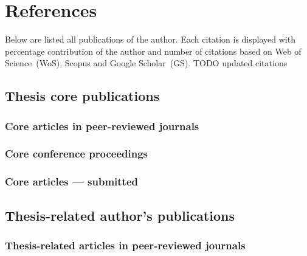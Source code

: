 \documentclass[a4paper,11pt,titlepage,twoside]{book}
\newcommand{\todo}[1]{{\color{red} TODO {#1}}}
\newcommand{\chapternoclear}[1]{
  \begingroup
  \let\cleardoublepage\clearpage
  \chapter{#1}
  \endgroup
}
\begin{document}
\chapternoclear{References}

Below are listed all publications of the author.
Each citation is displayed with percentage contribution of the author and number of citations based on Web of Science~(WoS), Scopus and Google Scholar~(GS).
\todo{updated citations}


\section{Thesis core publications}

\subsection*{Core articles in peer-reviewed journals}
\printbibliography[keyword={mine},keyword={phd_related},keyword={journal},keyword={core},notkeyword={submitted},heading=none,title={}]

\subsection*{Core conference proceedings}
\printbibliography[keyword={mine},keyword={phd_related},keyword={conference},keyword={core},notkeyword={submitted},heading=none,title={}]

\subsection*{Core articles --- submitted}
\printbibliography[keyword={mine},keyword={phd_related},keyword={submitted},keyword={core},heading=none,title={}]



\section{Thesis-related author's publications}

\subsection*{Thesis-related articles in peer-reviewed journals}
\printbibliography[keyword={mine},keyword={phd_related},keyword={journal},notkeyword={core},notkeyword={submitted},heading=none,title={}]

\end{document}
